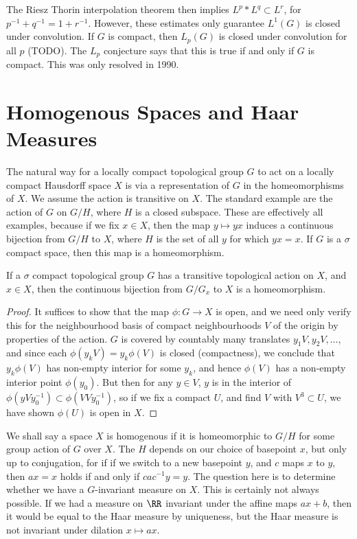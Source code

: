 The Riesz Thorin interpolation theorem then implies $L^p * L^q \subset L^r$, for $p^{-1} + q^{-1} = 1 + r^{-1}$. However, these estimates only guarantee $L^1(G)$ is closed under convolution. If $G$ is compact, then $L_p(G)$ is closed under convolution for all $p$ (TODO). The $L_p$ conjecture says that this is true if and only if $G$ is compact. This was only resolved in 1990.

\section{Homogenous Spaces and Haar Measures}

The natural way for a locally compact topological group $G$ to act on a locally compact Hausdorff space $X$ is via a representation of $G$ in the homeomorphisms of $X$. We assume the action is transitive on $X$. The standard example are the action of $G$ on $G/H$, where $H$ is a closed subspace. These are effectively all examples, because if we fix $x \in X$, then the map $y \mapsto yx$ induces a continuous bijection from $G/H$ to $X$, where $H$ is the set of all $y$ for which $yx = x$. If $G$ is a $\sigma$ compact space, then this map is a homeomorphism.

\begin{theorem}
    If a $\sigma$ compact topological group $G$ has a transitive topological action on $X$, and $x \in X$, then the continuous bijection from $G/G_x$ to $X$ is a homeomorphism.
\end{theorem}
\begin{proof}
    It suffices to show that the map $\phi: G \to X$ is open, and we need only verify this for the neighbourhood basis of compact neighbourhoods $V$ of the origin by properties of the action. $G$ is covered by countably many translates $y_1V, y_2V, \dots$, and since each $\phi(y_kV) = y_k \phi(V)$ is closed (compactness), we conclude that $y_k \phi(V)$ has non-empty interior for some $y_k$, and hence $\phi(V)$ has a non-empty interior point $\phi(y_0)$. But then for any $y \in V$, $y$ is in the interior of $\phi(y V y_0^{-1}) \subset \phi(VV y_0^{-1})$, so if we fix a compact $U$, and find $V$ with $V^3 \subset U$, we have shown $\phi(U)$ is open in $X$.
\end{proof}

We shall say a space $X$ is homogenous if it is homeomorphic to $G/H$ for some group action of $G$ over $X$. The $H$ depends on our choice of basepoint $x$, but only up to conjugation, for if if we switch to a new basepoint $y$, and $c$ maps $x$ to $y$, then $ax = x$ holds if and only if $cac^{-1}y = y$. The question here is to determine whether we have a $G$-invariant measure on $X$. This is certainly not always possible. If we had a measure on $\RR$ invariant under the affine maps $ax + b$, then it would be equal to the Haar measure by uniqueness, but the Haar measure is not invariant under dilation $x \mapsto ax$.

